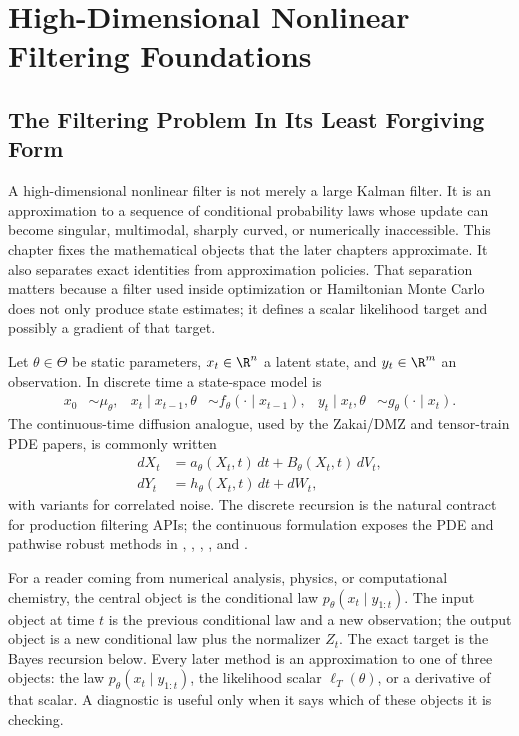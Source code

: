 \chapter[High-Dimensional Filtering Foundations]{High-Dimensional Nonlinear Filtering Foundations}
\label{ch:bf-highdim-nonlinear-foundations}

\section{The Filtering Problem In Its Least Forgiving Form}
\label{sec:bf-highdim-foundations-problem}

A high-dimensional nonlinear filter is not merely a large Kalman filter.  It is
an approximation to a sequence of conditional probability laws whose update
can become singular, multimodal, sharply curved, or numerically inaccessible.
This chapter fixes the mathematical objects that the later chapters approximate.
It also separates exact identities from approximation policies.  That separation
matters because a filter used inside optimization or Hamiltonian Monte Carlo
does not only produce state estimates; it defines a scalar likelihood target and
possibly a gradient of that target.

Let $\theta\in\Theta$ be static parameters, $x_t\in\R^n$ a latent state, and
$y_t\in\R^m$ an observation.  In discrete time a state-space model is
\begin{align}
  x_0 &\sim \mu_\theta, &
  x_t\mid x_{t-1},\theta &\sim f_\theta(\cdot\mid x_{t-1}), &
  y_t\mid x_t,\theta &\sim g_\theta(\cdot\mid x_t).
  \label{eq:bf-hd-ssm}
\end{align}
The continuous-time diffusion analogue, used by the Zakai/DMZ and tensor-train
PDE papers, is commonly written
\begin{align}
  dX_t &= a_\theta(X_t,t)\,dt + B_\theta(X_t,t)\,dV_t, \\
  dY_t &= h_\theta(X_t,t)\,dt + dW_t,
  \label{eq:bf-hd-continuous-ssm}
\end{align}
with variants for correlated noise.  The discrete recursion is the natural
contract for production filtering APIs; the continuous formulation exposes the
PDE and pathwise robust methods in \citet{davis1980multiplicative},
\citet{yau2000realtime}, \citet{yau2008realtime},
\citet{li2019ttfiltering}, and \citet{meng2025regularity}.

For a reader coming from numerical analysis, physics, or computational
chemistry, the central object is the conditional law
\(p_\theta(x_t\mid y_{1:t})\).  The input object at time \(t\) is the previous
conditional law and a new observation; the output object is a new conditional
law plus the normalizer \(Z_t\).  The exact target is the Bayes recursion below.
Every later method is an approximation to one of three objects: the law
\(p_\theta(x_t\mid y_{1:t})\), the likelihood scalar
\(\ell_T(\theta)\), or a derivative of that scalar.  A diagnostic is useful only
when it says which of these objects it is checking.

